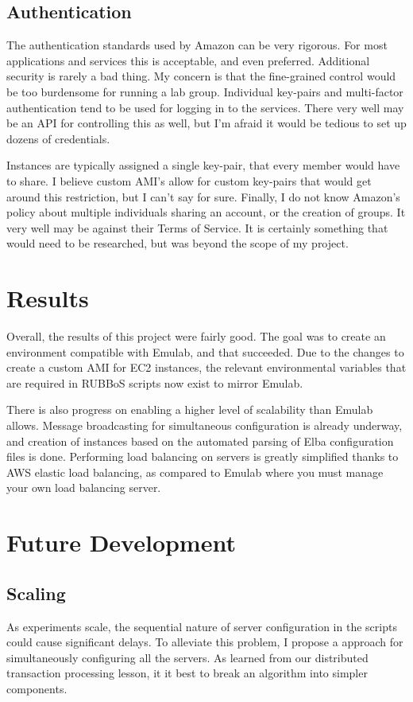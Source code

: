 \documentclass{article}
\begin{document}
\subsection{Authentication}
The authentication standards used by Amazon can be very rigorous. For most applications and services this is acceptable, and even preferred. Additional security is rarely a bad thing. My concern is that the fine-grained control would be too burdensome for running a lab group. Individual key-pairs and multi-factor authentication tend to be used for logging in to the services. There very well may be an API for controlling this as well, but I'm afraid it would be tedious to set up dozens of credentials.

Instances are typically assigned a single key-pair, that every member would have to share. I believe custom AMI's allow for custom key-pairs that would get around this restriction, but I can't say for sure.
Finally, I do not know Amazon's policy about multiple individuals sharing an account, or the creation of groups. It very well may be against their Terms of Service. It is certainly something that would need to be researched, but was beyond the scope of my project.
\section{Results}
Overall, the results of this project were fairly good. The goal was to create an environment compatible with Emulab, and that succeeded. Due to the changes to create a custom AMI for EC2 instances, the relevant environmental variables that are required in RUBBoS scripts now exist to mirror Emulab.

There is also progress on enabling a higher level of scalability than Emulab allows. Message broadcasting for simultaneous configuration is already underway, and creation of instances based on the automated parsing of Elba configuration files is done. Performing load balancing on servers is greatly simplified thanks to AWS elastic load balancing, as compared to Emulab where you must manage your own load balancing server.
\section{Future Development}
\subsection{Scaling}
As experiments scale, the sequential nature of server configuration in the scripts could cause significant delays. To alleviate this problem, I propose a approach for simultaneously configuring all the servers. As learned from our distributed transaction processing lesson, it it best to break an algorithm into simpler components.
\end{document}
